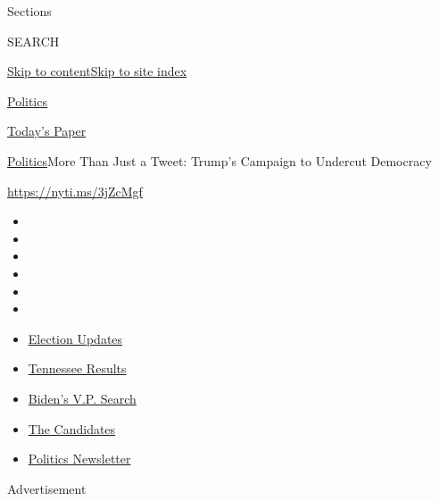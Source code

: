 Sections

SEARCH

\protect\hyperlink{site-content}{Skip to
content}\protect\hyperlink{site-index}{Skip to site index}

\href{https://www.nytimes.com/section/politics}{Politics}

\href{https://myaccount.nytimes.com/auth/login?response_type=cookie\&client_id=vi}{}

\href{https://www.nytimes.com/section/todayspaper}{Today's Paper}

\href{/section/politics}{Politics}\textbar{}More Than Just a Tweet:
Trump's Campaign to Undercut Democracy

\href{https://nyti.ms/3jZcMgf}{https://nyti.ms/3jZcMgf}

\begin{itemize}
\item
\item
\item
\item
\item
\item
\end{itemize}

\begin{itemize}
\item
  \href{https://www.nytimes.com/2020/08/07/us/elections/biden-vs-trump.html?action=click\&pgtype=Article\&state=default\&region=TOP_BANNER\&context=storylines_menu}{Election
  Updates}
\item
  \href{https://www.nytimes.com/interactive/2020/08/06/us/elections/results-tennessee-primary-elections.html?action=click\&pgtype=Article\&state=default\&region=TOP_BANNER\&context=storylines_menu}{Tennessee
  Results}
\item
  \href{https://www.nytimes.com/article/biden-vice-president-2020.html?action=click\&pgtype=Article\&state=default\&region=TOP_BANNER\&context=storylines_menu}{Biden's
  V.P. Search}
\item
  \href{https://www.nytimes.com/interactive/2019/us/politics/2020-presidential-candidates.html?action=click\&pgtype=Article\&state=default\&region=TOP_BANNER\&context=storylines_menu}{The
  Candidates}
\item
  \href{https://www.nytimes.com/newsletters/politics?action=click\&pgtype=Article\&state=default\&region=TOP_BANNER\&context=storylines_menu}{Politics
  Newsletter}
\end{itemize}

Advertisement

